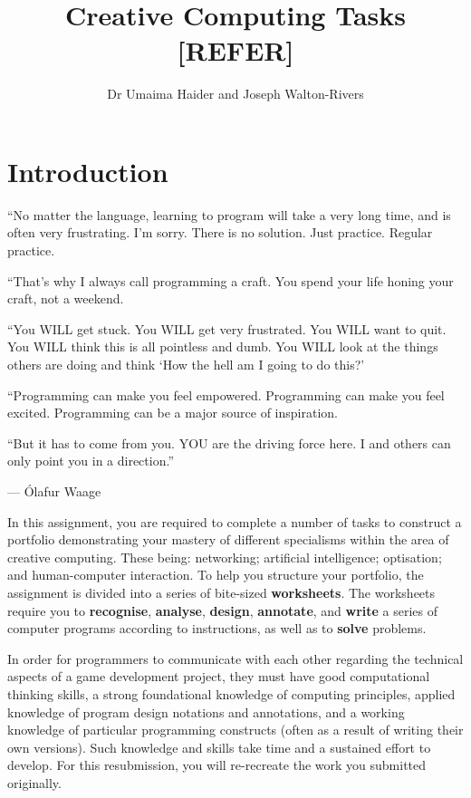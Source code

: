 \documentclass{../../fal_assignment}
\title{Creative Computing Tasks [REFER]}
\author{Dr Umaima Haider and Joseph Walton-Rivers}
\begin{document}
\maketitle

\section*{Introduction}

\begin{marginquote}
``No matter the language, learning to program will take a very long time, and is often very frustrating. I'm sorry. There is no solution. Just practice. Regular practice.

``That's why I always call programming a craft. You spend your life honing your craft, not a weekend.

``You WILL get stuck.
You WILL get very frustrated.
You WILL want to quit.
You WILL think this is all pointless and dumb.
You WILL look at the things others are doing and think `How the hell am I going to do this?'

``Programming can make you feel empowered.
Programming can make you feel excited.
Programming can be a major source of inspiration.

``But it has to come from you. YOU are the driving force here. I and others can only point you in a direction.''

\par --- \'Olafur Waage
\end{marginquote}

In this assignment, you are required to complete a number of tasks to construct a portfolio demonstrating your mastery of different specialisms within the area of creative computing. These being: networking; artificial intelligence; optisation; and human-computer interaction. To help you structure your portfolio, the assignment is divided into a series of bite-sized \textbf{worksheets}. The worksheets require you to \textbf{recognise}, \textbf{analyse}, \textbf{design}, \textbf{annotate}, and \textbf{write} a series of computer programs according to instructions, as well as to \textbf{solve} problems.

In order for programmers to communicate with each other regarding the technical aspects of a game development project, they must have good computational thinking skills, a strong foundational knowledge of computing principles, applied knowledge of program design notations and annotations, and a working knowledge of particular programming constructs (often as a result of writing their own versions). Such knowledge and skills take time and a sustained effort to develop. For this resubmission, you will re-recreate the work you submitted originally.
\end{document}
